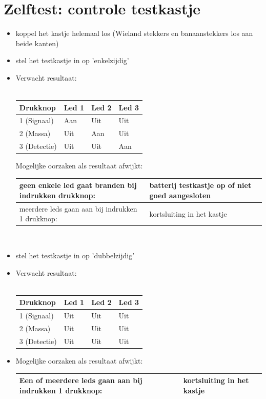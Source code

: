 \documentclass[12pt,a4paper]{report}
\begin{document}
\section{Zelftest: controle testkastje}
\begin{itemize}
\item koppel het kastje helemaal los (Wieland stekkers en banaanstekkers los aan beide kanten) 
\item stel het testkastje in op 'enkelzijdig' 
\item Verwacht resultaat:\\
\\
\begin{tabular}{|l|l|l|l|}
\hline
Drukknop&Led 1&Led 2&Led 3\\
\hline
1 (Signaal)&Aan&Uit&Uit\\
\hline
2 (Massa)&Uit&Aan&Uit\\
\hline
3 (Detectie)&Uit&Uit&Aan\\
\hline
\end{tabular}

Mogelijke oorzaken als resultaat afwijkt:\\
\begin{tabular}{|p{8cm}|p{6cm}|}
\hline
geen enkele led gaat branden bij indrukken drukknop:&batterij testkastje op of niet goed aangesloten\\
\hline
meerdere leds gaan aan bij indrukken 1 drukknop:&kortsluiting in het kastje\\
\hline
\end{tabular}\\

\item stel het testkastje in op 'dubbelzijdig' 
\item Verwacht resultaat:\\
\\
\begin{tabular}{|l|l|l|l|}
\hline
Drukknop&Led 1&Led 2&Led 3\\
\hline
1 (Signaal)&Uit&Uit&Uit\\
\hline
2 (Massa)&Uit&Uit&Uit\\
\hline
3 (Detectie)&Uit&Uit&Uit\\
\hline
\end{tabular}

\item Mogelijke oorzaken als resultaat afwijkt:\\
\begin{tabular}{|p{8cm}|p{6cm}|}
\hline
Een of meerdere leds gaan aan bij indrukken 1 drukknop:&kortsluiting in het kastje\\
\hline
\end{tabular}\\


\end{itemize}
\end{document}
